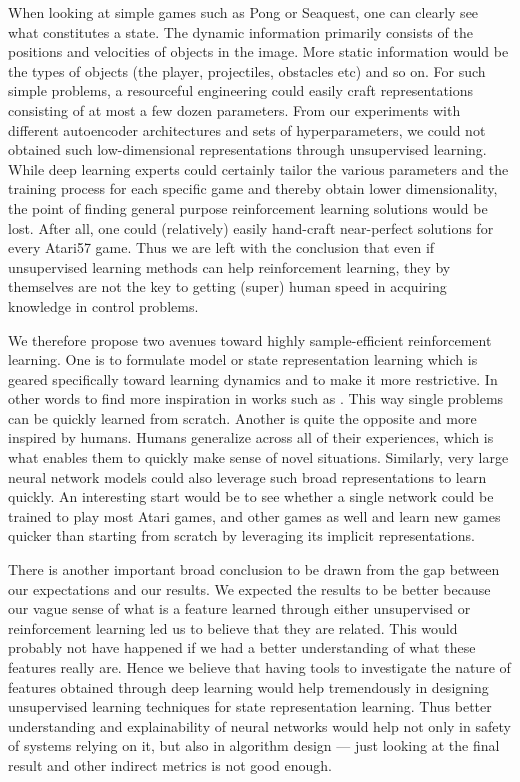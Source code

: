 When looking at simple games such as Pong or Seaquest,
one can clearly see what constitutes a state.
The dynamic information primarily consists of the positions and velocities of objects in the image.
More static information would be the types of objects (the player, projectiles, obstacles etc) and so on.
For such simple problems, a resourceful engineering could easily craft representations consisting of at most
a few dozen parameters.
From our experiments with different autoencoder architectures and sets of hyperparameters,
we could not obtained such low-dimensional representations through unsupervised learning.
While deep learning experts could certainly tailor the various parameters and the training process
for each specific game and thereby obtain lower dimensionality, the point of finding
general purpose reinforcement learning solutions would be lost.
After all, one could (relatively) easily hand-craft near-perfect solutions for every
Atari57 game.
Thus we are left with the conclusion that even if unsupervised learning methods 
can help reinforcement learning, they by themselves are not the key to getting (super) human speed in
acquiring knowledge in control problems.

We therefore propose two avenues toward highly sample-efficient reinforcement learning.
One is to formulate model or state representation learning which is geared specifically toward learning dynamics
and to make it more restrictive. In other words to find more inspiration in works such as \cite{pilco}.
This way single problems can be quickly learned from scratch.
Another is quite the opposite and more inspired by humans. 
Humans generalize across all of their experiences, which is what enables them to 
quickly make sense of novel situations.
Similarly, very large neural network models could also leverage such broad
representations to learn quickly. 
An interesting start would be to see whether a single network could be trained to play most Atari games,
and other games as well and learn new games quicker than starting from scratch by leveraging
its implicit representations.

There is another important broad conclusion to be drawn from the gap between our expectations
and our results.
We expected the results to be better because our vague sense of what is a feature
learned through either unsupervised or reinforcement learning led us to believe that they are related.
This would probably not have happened if we had a better understanding of what these features really are.
Hence we believe that having tools to investigate the nature of features obtained through deep learning would help
tremendously in designing unsupervised learning techniques for state representation learning.
Thus better understanding and explainability of neural networks would help not only
in safety of systems relying on it, but also in algorithm design ---
just looking at the final result and other indirect metrics is not good enough.




